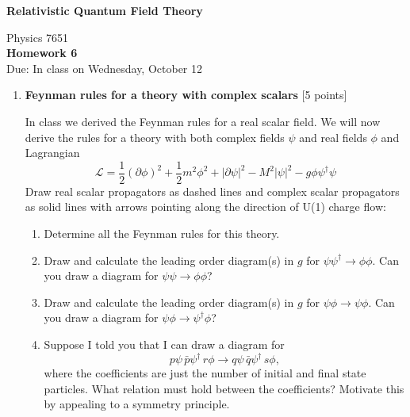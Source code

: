 \documentclass[12pt]{article}
\begin{document}
\vspace*{-1cm}
\begin{center}
{\LARGE \bf Relativistic Quantum Field Theory}

\vspace*{0.5cm}
{\Large Physics 7651} \\
\vspace*{0.5cm}
{\Large {\bf Homework 6}\\
\vspace*{0.5cm}
Due: In class on Wednesday, October 12}
\end{center}
\begin{enumerate}


\item  {\bf Feynman rules for a theory with complex scalars} [5 points]

In class we derived the Feynman rules for a real scalar field. We will now derive the rules for a theory with both complex fields $\psi$ and real fields $\phi$ and Lagrangian
$$
\mathcal L = \frac 12 \left(\partial \phi\right)^2  + \frac 12 m^2\phi^2 + \left|\partial \psi\right|^2 - M^2 |\psi|^2 - g\phi\psi^\dagger\psi
$$
Draw real scalar propagators as dashed lines and complex scalar propagators as solid lines with arrows pointing along the direction of U(1) charge flow:

\begin{center}
\end{center}

\begin{enumerate}
\item Determine all the Feynman rules for this theory.
\item Draw and calculate the leading order diagram(s) in $g$ for $\psi\psi^\dag \to \phi\phi$. Can you draw a diagram for $\psi\psi\to \phi\phi$?
\item Draw and calculate the leading order diagram(s) in $g$ for $\psi\phi \to \psi\phi$. Can you draw a diagram for $\psi\phi \to \psi^\dag\phi$?
\item Suppose I told you that I can draw a diagram for $$p \psi\, \bar p \psi^\dag \, r \phi \to q \psi \, \bar q \psi^\dag \, s \phi,$$ where the coefficients are just the number of initial and final state particles. What relation must hold between the coefficients? Motivate this by appealing to a symmetry principle.


\end{enumerate}
\end{enumerate}
\end{document}
